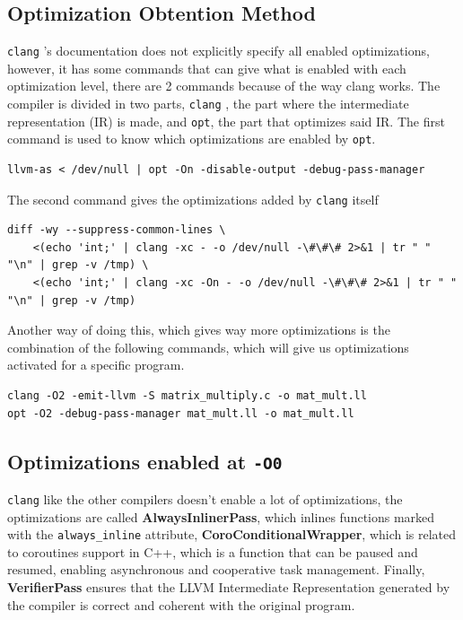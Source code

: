 \documentclass{rapport}
\newcommand{\clang}{\texttt{clang} }
\newcommand{\optizero}{\texttt{-O0} }
\begin{document}
\subsection*{Optimization Obtention Method}
\clang's documentation does not explicitly specify all enabled optimizations, however, it has some commands that can give what is enabled with each 
optimization level, there are 2 commands because of the way clang works. \newline
The compiler is divided in two parts, \clang, the part where the intermediate representation (IR) is made, and \texttt{opt}, the part that optimizes said IR. 
The first command is used to know which optimizations are enabled by \texttt{opt}.
\begin{verbatim}
llvm-as < /dev/null | opt -On -disable-output -debug-pass-manager
\end{verbatim}
The second command gives the optimizations added by \clang itself
\begin{verbatim}
diff -wy --suppress-common-lines \
    <(echo 'int;' | clang -xc - -o /dev/null -\#\#\# 2>&1 | tr " " "\n" | grep -v /tmp) \
    <(echo 'int;' | clang -xc -On - -o /dev/null -\#\#\# 2>&1 | tr " " "\n" | grep -v /tmp)
\end{verbatim}
Another way of doing this, which gives way more optimizations is the combination of the following commands, which will give us optimizations activated for a specific program. 
\begin{verbatim}
clang -O2 -emit-llvm -S matrix_multiply.c -o mat_mult.ll
opt -O2 -debug-pass-manager mat_mult.ll -o mat_mult.ll
\end{verbatim}

\subsection*{Optimizations enabled at \optizero}
\clang like the other compilers doesn't enable a lot of optimizations, the optimizations are called \textbf{AlwaysInlinerPass}, which inlines functions marked
with the \texttt{always\_inline} attribute, \textbf{CoroConditionalWrapper}, which is related to coroutines support in C++, which is a function that can be 
paused and resumed, enabling asynchronous and cooperative task management. \newline 
Finally, \textbf{VerifierPass} ensures that the LLVM Intermediate Representation 
generated by the compiler is correct and coherent with the original program.
\end{document}
